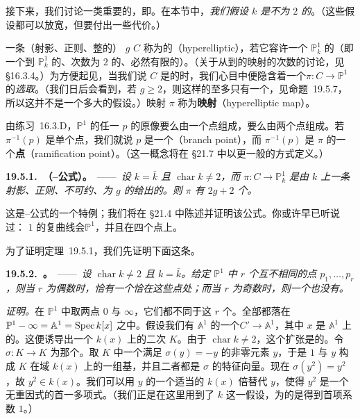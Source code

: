
\section{\trHyperelliptic\trCurve}

接下来，我们讨论一类重要的\trCurve，即\trHyperelliptic\trCurve。在本节中，\emph{我们假设 $k$ 是\trCharacteristic{}不为 $2$ 的\trAlgClosedField}。（这些假设都可以放宽，但要付出一些代价。）

一条（射影、正则、整的）\trGenus{} $g$ \trCurve{} $C$ 称为\textbf{\trHyperelliptic}的（hyperelliptic），若它容许一个 $\mathbb{P}^1_k$ 的\trDoubleCover（即一个到 $\mathbb{P}^1_k$ 的、次数为 $2$ 的、必然有限的\trMorphism）。（关于从\trCurve{}到\trCurve{}的映射的次数的讨论，见 \S16.3.4。）为方便起见，当我们说 $C$ 是\trHyperelliptic{}的时，我们心目中便隐含着一个\trDoubleCover $\pi\colon C\to\mathbb{P}^1$ 的\emph{选取}。（我们日后会看到，若 $g\ge 2$，则这样的\trDoubleCover{}至多只有一个，见\mbox{命题~19.5.7}，所以这并不是一个多大的假设。）映射 $\pi$ 称为\textbf{\trHyperelliptic{}映射}（hyperelliptic map）。

由\mbox{练习~16.3.D}，$\mathbb{P}^1$ 的任一\trClosedPoint{} $p$ 的原像要么由一个点组成，要么由两个点组成。若 $\pi^{-1}(p)$ 是单个点，我们就说 $p$ 是一个\textbf{\trBranchPoint}（branch point），而 $\pi^{-1}(p)$ 是 $\pi$ 的一个\textbf{\trRamification{}点}（ramification point）。（\trRamification{}这一概念将在 \S21.7 中以更一般的方式定义。）

\textbf{19.5.1.\ \trhTheorem（\trHyperelliptic{}\trRiemann--\trHurwitz{}公式）。}\ ——\ \emph{设 $k=\bar{k}$ 且 $\operatorname{char}k\ne 2$，而 $\pi\colon C\to\mathbb{P}^1_k$ 是由 $k$ 上一条射影、正则、不可约、\trGenus{}为 $g$ 的\trCurve{}给出的\trDoubleCover。则 $\pi$ 有 $2g+2$ 个\trBranchPoint。}

这是\trRiemann--\trHurwitz{}公式的一个特例；我们将在 \S21.4 中陈述并证明该公式。你或许早已听说过：\trGenus{} $1$ 的复曲线会\trDoubleCover $\mathbb{P}^1$，并且在四个点上\trRamification。

为了证明\mbox{定理~19.5.1}，我们先证明下面这条。

\textbf{19.5.2.\ \trhProposition。}\ ——\ \emph{设 $\operatorname{char}k\ne 2$ 且 $k=\bar{k}$。给定 $\mathbb{P}^1$ 中 $r$ 个互不相同的点 $p_1,\dots,p_r$，则当 $r$ 为偶数时，恰有一个\trDoubleCover{}恰在这些点处\trRamification；而当 $r$ 为奇数时，则一个也没有。}

\emph{证明。}\quad 在 $\mathbb{P}^1$ 中取两点 $0$ 与 $\infty$，它们都不同于这 $r$ 个\trBranchPoint。全部\trBranchPoint{}都落在 $\mathbb{P}^1-\infty=\mathbb{A}^1=\operatorname{Spec} k[x]$ 之中。假设我们有 $\mathbb{A}^1$ 的一个\trDoubleCover $C'\to\mathbb{A}^1$，其中 $x$ 是 $\mathbb{A}^1$ 上的\trCoordinate。这便诱导出一个 $k(x)$ 上的二次\trFieldExtension{} $K$。由于 $\operatorname{char}k\ne 2$，这个扩张是\trGalois{}的。令 $\sigma\colon K\to K$ 为那个\trGalois{}\trInvolution。取 $K$ 中一个满足 $\sigma(y)=-y$ 的非零元素 $y$，于是 $1$ 与 $y$ 构成 $K$ 在域 $k(x)$ 上的一组基，并且二者都是 $\sigma$ 的特征向量。现在 $\sigma(y^2)=y^2$，故 $y^2\in k(x)$。我们可以用 $y$ 的一个适当的 $k(x)$ 倍替代 $y$，使得 $y^2$ 是一个无重因式的首一多项式。（我们正是在这里用到了 $k$ \trAlgClosed{}这一假设，为的是得到首项系数 $1$。）

